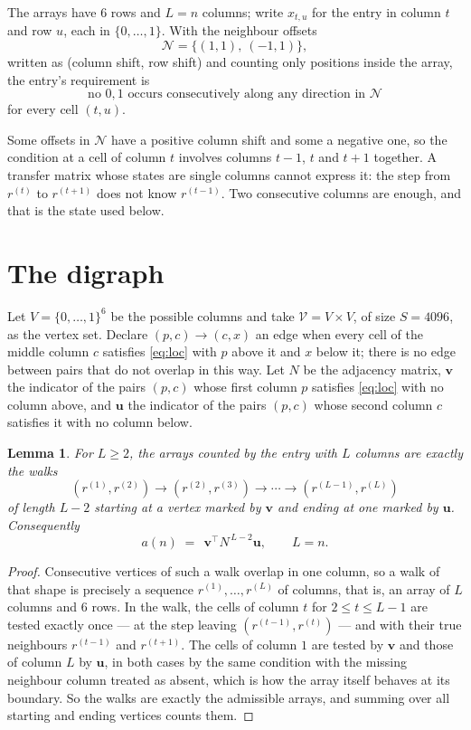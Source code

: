 \documentclass[11pt,a4paper]{article}
\theoremstyle{plain}
\newtheorem{lemma}[theorem]{Lemma}
\theoremstyle{definition}
\begin{document}
The arrays have $6$ rows and $L=n$ columns; write $x_{t,u}$ for the entry in
column $t$ and row $u$, each in $\{0,\dots,1\}$. With the neighbour offsets
\[
\mathcal N=\{(1,1),\ (-1,1)\},
\]
written as (column shift, row shift) and counting only positions inside the array, the
entry's requirement is
\begin{equation}\label{eq:loc}
\text{no }0,1\text{ occurs consecutively along any direction in }\mathcal N
\end{equation}
for every cell $(t,u)$.

Some offsets in $\mathcal N$ have a positive column shift and some a negative one, so the
condition at a cell of column $t$ involves columns $t-1$, $t$ and $t+1$ together. A transfer
matrix whose states are single columns cannot express it: the step from $r^{(t)}$ to
$r^{(t+1)}$ does not know $r^{(t-1)}$. Two consecutive columns are enough, and that is
the state used below.

\section{The digraph}

Let $V=\{0,\dots,1\}^{6}$ be the possible columns and take
$\mathcal V=V\times V$, of size $S=4096$, as the vertex set. Declare $(p,c)\to(c,x)$ an edge
when every cell of the middle column $c$ satisfies \eqref{eq:loc} with $p$ above it and $x$
below it; there is no edge between pairs that do not overlap in this way. Let $N$ be the
adjacency matrix, $\mathbf{v}$ the indicator of the pairs $(p,c)$ whose first column $p$
satisfies \eqref{eq:loc} with no column above, and $\mathbf{u}$ the indicator of
the pairs $(p,c)$ whose second column $c$ satisfies it with no column below.

\begin{lemma}\label{lem:walk}
For $L\ge2$, the arrays counted by the entry with $L$ columns are exactly the walks
\[
(r^{(1)},r^{(2)})\to(r^{(2)},r^{(3)})\to\cdots\to(r^{(L-1)},r^{(L)})
\]
of length $L-2$ starting at a vertex marked by $\mathbf{v}$ and ending at one marked by
$\mathbf{u}$. Consequently
\[
a(n)\;=\;\,\mathbf{v}^{\!\top}N^{\,L-2}\mathbf{u},\qquad L=n .
\]
\end{lemma}

\begin{proof}
Consecutive vertices of such a walk overlap in one column, so a walk of that shape is
precisely a sequence $r^{(1)},\dots,r^{(L)}$ of columns, that is, an array of $L$ columns
and $6$ rows. In the walk, the cells of column $t$ for $2\le t\le L-1$ are tested
exactly once --- at the step leaving $(r^{(t-1)},r^{(t)})$ --- and with their true
neighbours $r^{(t-1)}$ and $r^{(t+1)}$. The cells of column $1$ are tested by
$\mathbf{v}$ and those of column $L$ by $\mathbf{u}$, in both cases by the same condition
with the missing neighbour column treated as absent, which is how the array itself behaves at
its boundary. So the walks are exactly the admissible arrays, and summing over all starting
and ending vertices counts them.
\end{proof}
\end{document}

